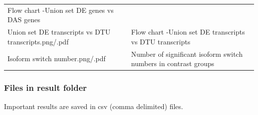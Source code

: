 \documentclass[]{article}
\begin{document}
\begin{longtable}[]{@{}ll@{}}
\begin{minipage}[t]{0.43\columnwidth}
Flow chart -Union set DE genes vs DAS genes\strut
\end{minipage}\tabularnewline
\begin{minipage}[t]{0.51\columnwidth}\raggedright\strut
Union set DE transcripts vs DTU transcripts.png/.pdf\strut
\end{minipage} & \begin{minipage}[t]{0.43\columnwidth}\raggedright\strut
Flow chart -Union set DE transcripts vs DTU transcripts\strut
\end{minipage}\tabularnewline
\begin{minipage}[t]{0.51\columnwidth}\raggedright\strut
Isoform switch number.png/.pdf\strut
\end{minipage} & \begin{minipage}[t]{0.43\columnwidth}\raggedright\strut
Number of significant isoform switch numbers in contrast groups\strut
\end{minipage}\tabularnewline
\bottomrule
\end{longtable}

\subsubsection{Files in result folder}\label{files-in-result-folder}

Important results are saved in csv (comma delimited) files.
\end{document}
